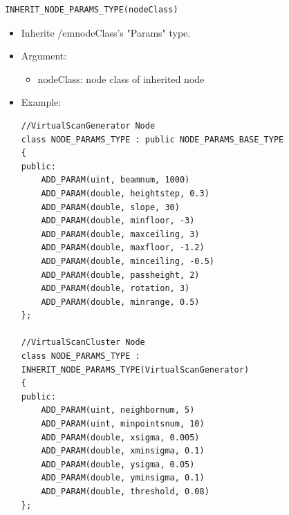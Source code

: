 \documentclass[a4paper,10pt]{book}
\begin{document}
\begin{mdframed}
\begin{verbatim}
INHERIT_NODE_PARAMS_TYPE(nodeClass)
\end{verbatim}
\begin{itemize}
 \item Inherite {/em{nodeClass}}'s "Params" type.
 \item Argument:
 \begin{itemize}
  \item nodeClass: node class of inherited node
 \end{itemize}
 \item Example:
 \begin{verbatim}
//VirtualScanGenerator Node
class NODE_PARAMS_TYPE : public NODE_PARAMS_BASE_TYPE
{
public:
    ADD_PARAM(uint, beamnum, 1000)
    ADD_PARAM(double, heightstep, 0.3)
    ADD_PARAM(double, slope, 30)
    ADD_PARAM(double, minfloor, -3)
    ADD_PARAM(double, maxceiling, 3)
    ADD_PARAM(double, maxfloor, -1.2)
    ADD_PARAM(double, minceiling, -0.5)
    ADD_PARAM(double, passheight, 2)
    ADD_PARAM(double, rotation, 3)
    ADD_PARAM(double, minrange, 0.5)
};

//VirtualScanCluster Node
class NODE_PARAMS_TYPE : INHERIT_NODE_PARAMS_TYPE(VirtualScanGenerator)
{
public:
    ADD_PARAM(uint, neighbornum, 5)
    ADD_PARAM(uint, minpointsnum, 10)
    ADD_PARAM(double, xsigma, 0.005)
    ADD_PARAM(double, xminsigma, 0.1)
    ADD_PARAM(double, ysigma, 0.05)
    ADD_PARAM(double, yminsigma, 0.1)
    ADD_PARAM(double, threshold, 0.08)
};
 \end{verbatim}
\end{itemize}
\end{mdframed}
\end{document}

